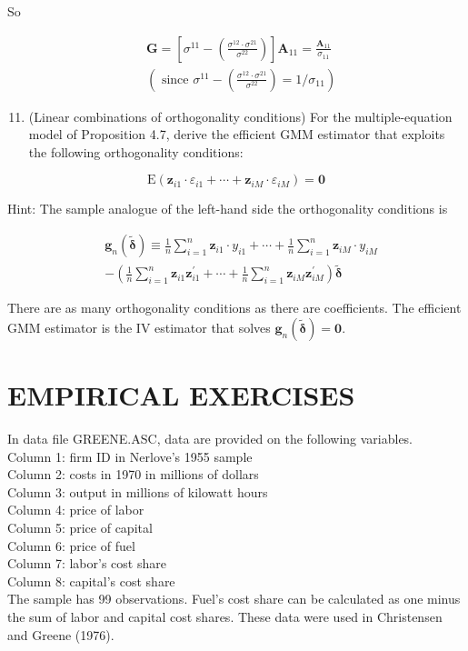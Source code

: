 \documentclass[10pt]{article}
\begin{document}
So

$$
\begin{aligned}
& \mathbf{G}=\left[\sigma^{11}-\left(\frac{\sigma^{12} \cdot \sigma^{21}}{\sigma^{22}}\right)\right] \mathbf{A}_{11}=\frac{\mathbf{A}_{11}}{\sigma_{11}} \\
&\left(\text { since } \sigma^{11}-\left(\frac{\sigma^{12} \cdot \sigma^{21}}{\sigma^{22}}\right)=1 / \sigma_{11}\right)
\end{aligned}
$$

\begin{enumerate}
  \setcounter{enumi}{10}
  \item (Linear combinations of orthogonality conditions) For the multiple-equation model of Proposition 4.7, derive the efficient GMM estimator that exploits the following orthogonality conditions:
\end{enumerate}


\begin{equation*}
\mathrm{E}\left(\mathbf{z}_{i 1} \cdot \varepsilon_{i 1}+\cdots+\mathbf{z}_{i M} \cdot \varepsilon_{i M}\right)=\mathbf{0} \tag{1}
\end{equation*}


Hint: The sample analogue of the left-hand side the orthogonality conditions is

$$
\begin{aligned}
& \mathbf{g}_{n}(\tilde{\boldsymbol{\delta}}) \equiv \frac{1}{n} \sum_{i=1}^{n} \mathbf{z}_{i 1} \cdot y_{i 1}+\cdots+\frac{1}{n} \sum_{i=1}^{n} \mathbf{z}_{i M} \cdot y_{i M} \\
&-\left(\frac{1}{n} \sum_{i=1}^{n} \mathbf{z}_{i 1} \mathbf{z}_{i 1}^{\prime}+\cdots+\frac{1}{n} \sum_{i=1}^{n} \mathbf{z}_{i M} \mathbf{z}_{i M}^{\prime}\right) \tilde{\boldsymbol{\delta}}
\end{aligned}
$$

There are as many orthogonality conditions as there are coefficients. The efficient GMM estimator is the IV estimator that solves $\mathbf{g}_{n}(\tilde{\boldsymbol{\delta}})=\mathbf{0}$.

\section*{EMPIRICAL EXERCISES}
In data file GREENE.ASC, data are provided on the following variables.\\
Column 1: firm ID in Nerlove's 1955 sample\\
Column 2: costs in 1970 in millions of dollars\\
Column 3: output in millions of kilowatt hours\\
Column 4: price of labor\\
Column 5: price of capital\\
Column 6: price of fuel\\
Column 7: labor's cost share\\
Column 8: capital's cost share\\
The sample has 99 observations. Fuel's cost share can be calculated as one minus the sum of labor and capital cost shares. These data were used in Christensen and Greene (1976).
\end{document}

